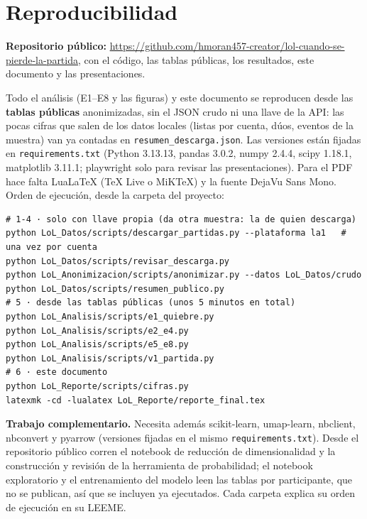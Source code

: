 \documentclass[11pt,letterpaper]{article}
\begin{document}
\section{Reproducibilidad}

\noindent\textbf{Repositorio público:}
\url{https://github.com/hmoran457-creator/lol-cuando-se-pierde-la-partida}, con el código, las
tablas públicas, los resultados, este documento y las presentaciones.

Todo el análisis (E1--E8 y las figuras) y este documento se reproducen desde las
\textbf{tablas públicas} anonimizadas, sin el JSON crudo ni una llave de la API: las
pocas cifras que salen de los datos locales (listas por cuenta, dúos, eventos de la
muestra) van ya contadas en \texttt{resumen\_descarga.json}. Las versiones están fijadas
en \texttt{requirements.txt} (Python 3.13.13, pandas 3.0.2, numpy 2.4.4, scipy 1.18.1,
matplotlib 3.11.1; playwright solo para revisar las presentaciones). Para el PDF hace
falta LuaLaTeX (TeX Live o MiKTeX) y la fuente DejaVu Sans Mono. Orden de ejecución,
desde la carpeta del proyecto:

\begin{Verbatim}[fontsize=\small, formatcom=\codigo, frame=lines]
# 1-4 · solo con llave propia (da otra muestra: la de quien descarga)
python LoL_Datos/scripts/descargar_partidas.py --plataforma la1   # una vez por cuenta
python LoL_Datos/scripts/revisar_descarga.py
python LoL_Anonimizacion/scripts/anonimizar.py --datos LoL_Datos/crudo
python LoL_Datos/scripts/resumen_publico.py
# 5 · desde las tablas públicas (unos 5 minutos en total)
python LoL_Analisis/scripts/e1_quiebre.py
python LoL_Analisis/scripts/e2_e4.py
python LoL_Analisis/scripts/e5_e8.py
python LoL_Analisis/scripts/v1_partida.py
# 6 · este documento
python LoL_Reporte/scripts/cifras.py
latexmk -cd -lualatex LoL_Reporte/reporte_final.tex
\end{Verbatim}

\noindent \textbf{Trabajo complementario.} Necesita además scikit-learn, umap-learn, nbclient,
nbconvert y pyarrow (versiones fijadas en el mismo \texttt{requirements.txt}). Desde el
repositorio público corren el notebook de reducción de dimensionalidad y la construcción y
revisión de la herramienta de probabilidad; el notebook exploratorio y el entrenamiento del
modelo leen las tablas por participante, que no se publican, así que se incluyen ya
ejecutados. Cada carpeta explica su orden de ejecución en su LEEME.
\end{document}
